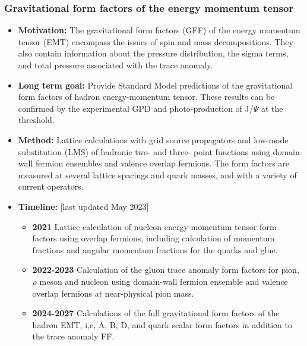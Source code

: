 \documentclass[12pt,hyperpdf]{article}
\begin{document}
\subsubsection{Gravitational form factors of the energy momentum tensor}
\begin{itemize}
    \item{\bf Motivation:} The gravitational form factors (GFF) of the
      energy momentum tensor (EMT) encompass the issues of spin and
      mass decompositions. They also contain information about the
      pressure distribution, the sigma terms, and total pressure
      associated with the trace anomaly. 
    \item{\bf Long term goal:} Provide Standard Model predictions of the
      gravitational form factors of hadron energy-momentum
      tensor. These results can be confirmed by the experimental GPD
      and  photo-production of J/$\Psi$ at the threshold. 
    \item{\bf Method:} Lattice calculations with grid source propagators
      and low-mode substitution (LMS) of hadronic two- and three-
      point functions using domain-wall fermion ensembles and valence
      overlap fermions. The form factors are measured at several
      lattice spacings and quark masses, and with a variety of current
      operators.  
\item{\bf Timeline:} \hfill [last updated May 2023]
\begin{itemize}
    \item{\bf 2021} Lattice calculation of nucleon energy-momentum tensor
      form factors using overlap fermions, including calculation of
      momentum fractions and angular momentum fractions for the quarks
      and glue. 
    \item{\bf 2022-2023} Calculation of the gluon trace anomaly form
      factors for pion, $\rho$ meson and nucleon using domain-wall
      fermion ensemble and valence overlap fermions at near-physical
      pion mass. 
    \item{\bf 2024-2027} Calculations of the full gravitational form
      factors of the hadron EMT, i,e, A, B, D, and quark scalar form
      factors in addition to the trace anomaly FF.  
\end{itemize}
\end{itemize}




\end{document}
